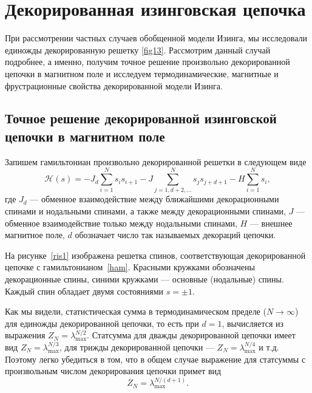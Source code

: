 \chapter{Декорированная изинговская цепочка}\label{ch:ch3}

При рассмотрении частных случаев обобщенной модели Изинга, мы исследовали единожды декорированную решетку \ref{fig13}. Рассмотрим данный случай подробнее, а именно, получим точное решение произвольно декорированной цепочки в магнитном поле и исследуем термодинамические, магнитные и фрустрационные свойства декорированной модели Изинга. 

\section{Точное решение декорированной изинговской цепочки в магнитном поле}\label{sec:ch3/sect1}

Запишем гамильтониан произвольно декорированной решетки в следующем виде
\begin{equation}
\mathcal{H}(s) = -J_{d}\sum_{i=1}^{N} s_{i} s_{i+1} - J\sum_{j=1,d+2,\dots}^{N} s_{j}s_{j+d+1} - H \sum_{i=1}^{N} s_{i},
\label{ham}
\end{equation}
где $J_d$ --- обменное взаимодействие между ближайшими декорационными спинами и нодальными спинами, а также между декорационными спинами, $J$ --- обменное взаимодействие только между нодальными спинами, $H$ --- внешнее магнитное поле, $d$ обозначает число так называемых \guillemotleft декораций\guillemotright $ $ цепочки.


На рисунке~\ref{ris1} изображена решетка спинов, соответствующая декорированной цепочке с гамильтонианом~\eqref{ham}.
Красными кружками обозначены декорационные спины, синими кружками --- основные (нодальные) спины.
Каждый спин обладает двумя состояниями $s=\pm 1$.

Как мы видели, статистическая сумма в термодинамическом пределе ($N\rightarrow \infty$) для единожды декорированной цепочки, то есть при $d=1$, вычисляется из выражения $Z_{N} = \lambda_{\text{max}}^{N/2}$. Статсумма для дважды декорированной цепочки имеет вид $Z_{N} = \lambda_{\text{max}}^{N/3}$, для трижды декорированной цепочки --- $Z_{N} = \lambda_{\text{max}}^{N/4}$ и  т.д. Поэтому легко убедиться в том, что в общем случае выражение для статсуммы с произвольным числом декорирования цепочки примет вид 
\begin{equation}
Z_{N} = \lambda_{\text{max}}^{N/(d+1)}.
\label{zn}
\end{equation}

